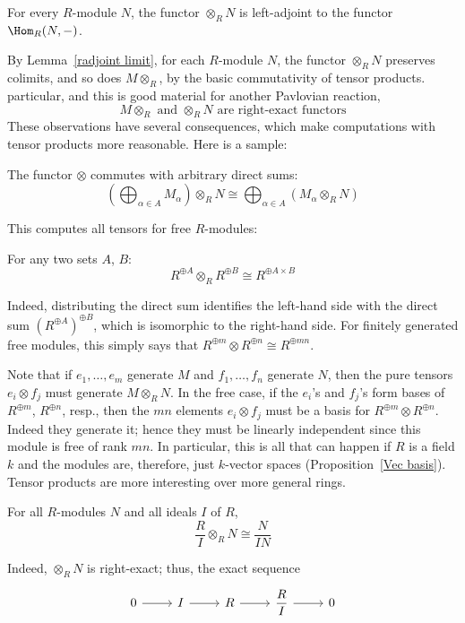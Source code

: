 \begin{corollary}\label{tensor adj}
For every $R$-module $N$, the functor $\otimes_{R}N$ is left-adjoint to the functor $\Hom_R(N,-)$.
\end{corollary}
By Lemma~\ref{radjoint limit}, for each $R$-module $N$, the functor $\otimes_{R}N$ preserves colimits, and so does $M\otimes_{R}$, by the basic commutativity of tensor products. particular, and this is good material for another Pavlovian reaction,
\[M\otimes_{R}\text{ and }\otimes_{R}N\text{ are right-exact functors}\]
These observations have several consequences, which make computations with tensor products more reasonable. Here is a sample:
\begin{corollary}\label{tensor sum}
The functor $\otimes$ commutes with arbitrary direct sums:
\[(\bigoplus_{\alpha\in A}M_\alpha)\otimes_{R}N\cong\bigoplus_{\alpha\in A}(M_\alpha\otimes_{R}N)\]
\end{corollary}
This computes all tensors for free $R$-modules:
\begin{corollary}\label{ten sum}
For any two sets $A$, $B$:
\[R^{\oplus A}\otimes_{R}R^{\oplus B}\cong R^{\oplus A\times B}\]
\end{corollary}
Indeed, distributing the direct sum identifies the left-hand side with the direct sum $(R^{\oplus A})^{\oplus B}$, which is isomorphic to the right-hand side. For finitely generated free modules, this simply says that $R^{\oplus m}\otimes R^{\oplus n}\cong R^{\oplus mn}$.\par
Note that if $e_1,\dots,e_m$ generate $M$ and $f_1,\dots,f_n$ generate $N$, then the pure tensors $e_i\otimes f_j$ must generate $M\otimes_{R}N$. In the free case, if the $e_i$'s and $f_j$'s form bases of $R^{\oplus m}$, $R^{\oplus n}$, resp., then the $mn$ elements $e_i\otimes f_j$ must be a basis for $R^{\oplus m}\otimes R^{\oplus n}$. Indeed they generate it; hence they must be linearly independent since this module is free of rank $mn$. In particular, this is all that can happen if $R$ is a field $k$ and the modules are, therefore, just $k$-vector spaces (Proposition~\ref{Vec basis}). Tensor products are more interesting over more general rings.
\begin{corollary}\label{tens with module}
For all $R$-modules $N$ and all ideals $I$ of $R$,
\[\dfrac{R}{I}\otimes_{R}N\cong\dfrac{N}{IN}\]
\end{corollary}
Indeed, $\otimes_{R}N$ is right-exact; thus, the exact sequence
\[\begin{tikzcd}
0\ar[r]&I\ar[r]&R\ar[r]&\dfrac{R}{I}\ar[r]&0
\end{tikzcd}\]
